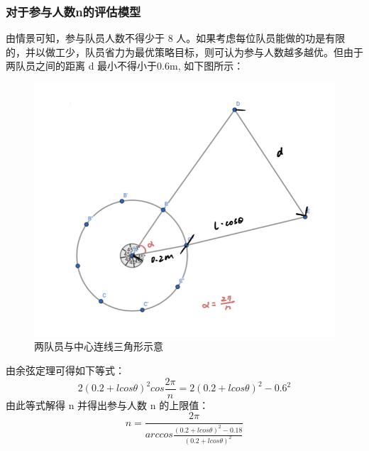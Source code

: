\documentclass[withoutpreface,bwprint]{cumcmthesis}
\begin{document}
\subsubsection{对于参与人数n的评估模型}
由情景可知，参与队员人数不得少于 8 人。如果考虑每位队员能做的功是有限的，并以做工少，队员省力为最优策略目标，则可认为参与人数越多越优。但由于两队员之间的距离 d 最小不得小于0.6m, 如下图所示：
\begin{figure}[H]
	\centering
	\includegraphics[scale = 0.75]{N.png}
	\caption{两队员与中心连线三角形示意}
\end{figure}
由余弦定理可得如下等式：
\[2\left(0.2 + lcos\theta\right)^2cos\frac{2\pi}{n} = 2\left(0.2 + lcos\theta\right)^2 - 0.6^2\]
由此等式解得 n 并得出参与人数 n 的上限值：
\[n = \frac{2\pi}{arccos\frac{\left(0.2 + lcos\theta\right)^2 - 0.18}{\left(0.2 + lcos\theta\right)^2}}\]
\end{document}
